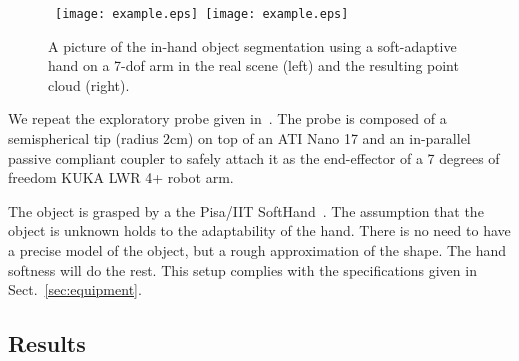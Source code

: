 \begin{figure}
\centering
  \mbox{
  \texttt{[image: example.eps]}
  \texttt{[image: example.eps]}
  }
  \caption{A picture of the in-hand object segmentation using a soft-adaptive hand on a 7-dof arm in the real scene (left) and the resulting point cloud (right).}
  \label{fig:in-hand-segmentation}
\end{figure}

We repeat the exploratory probe given in~\citet{Rosales2014Active}. The probe is composed of a semispherical tip (radius $2$cm) on top of an ATI Nano 17 and an in-parallel passive compliant coupler to safely attach it as the end-effector of a 7 degrees of freedom KUKA LWR 4+ robot arm.

The object is grasped by a the Pisa/IIT SoftHand~\citet{Catalano2014Adaptive}. The assumption that the object is unknown holds to the adaptability of the hand.
There is no need to have a precise model of the object, but a rough approximation of the shape. The hand softness will do the rest. This setup complies with the specifications given in Sect.~\ref{sec:equipment}.



\subsection{Results}



\label{sec:results}

